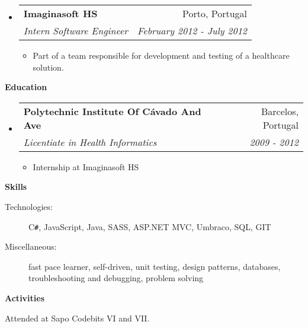 \documentclass[letterpaper,11pt]{article}
\makeatletter
\newcommand{\resitem}[1]{\item #1 \vspace{-2pt}}
\newcommand{\resheading}[1]{{\large \colorbox{mygrey}{\begin{minipage}{\textwidth}{\textbf{#1 \vphantom{p\^{E}}}}\end{minipage}}}}
\newcommand{\ressubheading}[4]{
	\begin{tabular*}{7.0in}{l@{\extracolsep{\fill}}r}
		\textbf{#1} & #2 \\
		\textit{#3} & \textit{#4} \\
	\end{tabular*}\vspace{-6pt}}
\makeatother
\begin{document}
\begin{itemize}
		\item
		\ressubheading{Imaginasoft HS}{Porto, Portugal}{Intern Software Engineer}{February 2012 - July 2012}
		\begin{itemize}
			\resitem{Part of a team responsible for development and testing of a healthcare solution.}
		\end{itemize}
	\end{itemize}
	
	\resheading{Education}
	\begin{itemize}
		\item
		\ressubheading{Polytechnic Institute Of C\'avado And Ave}{Barcelos, Portugal}{Licentiate in Health Informatics}{2009 - 2012}
		\begin{itemize}
			\resitem{Internship at Imaginasoft HS}
		\end{itemize}
		
	\end{itemize}
	
	
	\resheading{Skills}
	
	\begin{description}
		\item[Technologies:]
		C{}\verb!#!, JavaScript, Java, SASS, ASP.NET MVC, Umbraco, SQL, GIT
		\item[Miscellaneous:]
		fast pace learner, self-driven, unit testing, design patterns, databases, troubleshooting and debugging, problem solving
	\end{description}	
	
	\resheading{Activities}
	
	\begin{description}
		\item[Attended at Sapo Codebits VI and VII.]
	\end{description}
	
\end{document}
